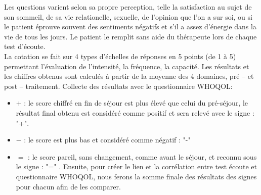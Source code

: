 Les questions varient selon sa propre perception, telle la satisfaction
au sujet de son  sommeil, de sa vie relationelle, sexuelle, de
l'opinion que l'on a sur soi, ou si le patient éprouve souvent des sentiments négatifs
et s'il a assez d'énergie dans la vie de tous les jours.
Le patient le remplit sans aide du
thérapeute lors de chaque test
d'écoute.
\\
La cotation se fait sur 4 types d'échelles de réponses en 5 points (de 1 à 5)
permettant l'évaluation de l'intensité, la fréquence, la capacité.
Les résultats et les chiffres obtenus  sont calculés à partir de la moyenne des 4
domaines, pré -- et post -- traitement.
Collecte des résultats avec le questionnaire WHOQOL:	
\begin{itemize}
	\item$+$  :  le score chiffré  en fin de séjour est plus élevé
	que celui du
	pré-séjour, le résultat final obtenu est considéré comme
	positif et sera relevé  avec le signe : "+". 
	\item $-$ : le score est plus bas et considéré comme négatif : "-"  
	\item$=$ : le score pareil, sans changement,  comme avant le séjour, et reconnu sous le signe :  "=" .
	Ensuite, pour créer le lien et la corrélation entre test écoute et questionnaire WHOQOL, nous ferons la 
	somme finale des résultats des signes pour chacun afin de les comparer.
\end{itemize}




